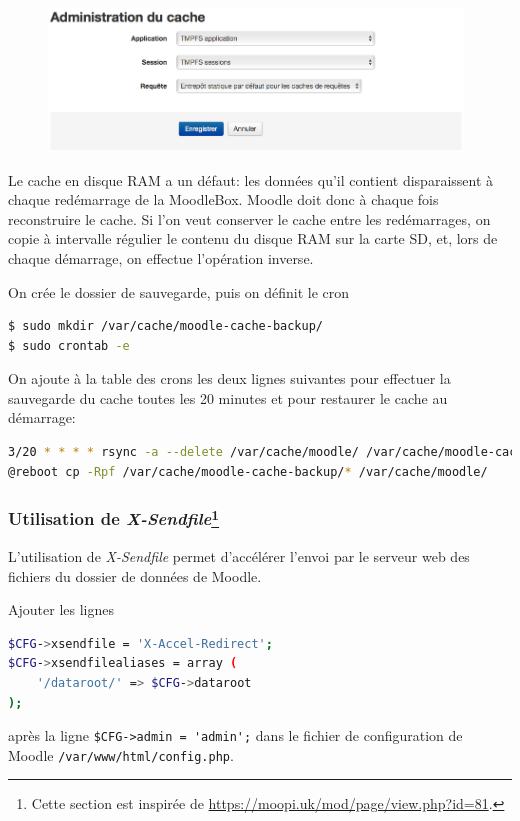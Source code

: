 \documentclass[11pt]{article}
\begin{document}
\begin{figure}[!ht]
\begin{minipage}[b]{\linewidth}
\centering
\includegraphics[width=11cm]{cache-association.png}
\end{minipage}
\end{figure}

Le cache en disque RAM a un défaut: les données qu'il contient disparaissent à chaque redémarrage de la MoodleBox. Moodle doit donc à chaque fois reconstruire le cache. Si l'on veut conserver le cache entre les redémarrages, on copie à intervalle régulier le contenu du disque RAM sur la carte SD, et, lors de chaque démarrage, on effectue l'opération inverse.

On crée le dossier de sauvegarde, puis on définit le cron
\begin{lstlisting}[language=bash]
$ sudo mkdir /var/cache/moodle-cache-backup/
$ sudo crontab -e
\end{lstlisting}

On ajoute à la table des crons les deux lignes suivantes pour effectuer la sauvegarde du cache toutes les 20 minutes et pour restaurer le cache au démarrage:
\begin{lstlisting}[language=bash]
3/20 * * * * rsync -a --delete /var/cache/moodle/ /var/cache/moodle-cache-backup/
@reboot cp -Rpf /var/cache/moodle-cache-backup/* /var/cache/moodle/
\end{lstlisting}

\subsubsection[Utilisation de \emph{X-Sendfile}]{Utilisation de \emph{X-Sendfile}\footnote{Cette section est inspirée de \url{https://moopi.uk/mod/page/view.php?id=81}.}}

L'utilisation de \emph{X-Sendfile} permet d'accélérer l'envoi par le serveur web des fichiers du dossier de données de Moodle.

Ajouter les lignes
\begin{lstlisting}[language=bash]
$CFG->xsendfile = 'X-Accel-Redirect';
$CFG->xsendfilealiases = array (
    '/dataroot/' => $CFG->dataroot
);
\end{lstlisting}
après la ligne \lstinline{$CFG->admin = 'admin';} dans le fichier de configuration de Moodle \lstinline{/var/www/html/config.php}.
\end{document}
